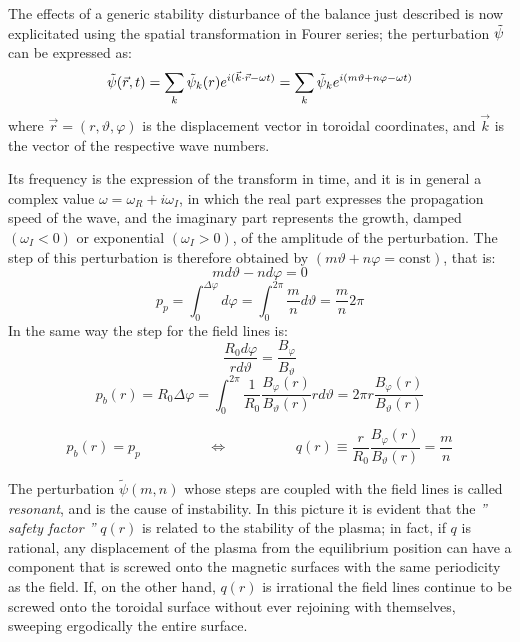 The effects of a generic stability disturbance of the balance just described is now explicitated using the spatial transformation in Fourer series; the perturbation $\Tilde{\psi}$ can be expressed as:
\begin{equation}
    \Tilde{\psi}(\Vec{r},t) = \sum_k \Tilde{\psi}_k(r) e^{i(\Vec{k}\cdot\Vec{r}-\omega t)} = \sum_k \Tilde{\psi}_k e^{i(m\vartheta+n\varphi-\omega t)}
\end{equation}
where $\Vec{r} = (r,\vartheta,\varphi)$ is the displacement vector in toroidal coordinates, and $\Vec{k}$ is the vector of the respective wave numbers.

Its frequency is the expression of the transform in time, and it is in general a complex value $\omega = \omega_R + i \omega_I$, in which the real part expresses the propagation speed of the wave, and the imaginary part represents the growth, damped $(\omega_I < 0)$ or exponential $(\omega_I > 0)$, of the amplitude of the perturbation. The step of this perturbation is therefore obtained by $(m\vartheta + n\varphi = \text{const})$, that is:
$$  m d\vartheta - n d\varphi = 0    $$
$$  p_p = \int_0^{\Delta\varphi} d\varphi = \int_0^{2\pi} \frac{m}{n}d\vartheta = \frac{m}{n} 2\pi  $$
In the same way the step for the field lines is:
$$  \frac{R_0 d\varphi}{r d\vartheta} = \frac{B_\varphi}{B_\vartheta} $$
$$  p_b(r) = R_0\Delta\varphi = \int_0^{2\pi} \frac{1}{R_0} \frac{B_\varphi(r)}{B_\vartheta(r)} r d\vartheta = 2\pi r \frac{B_\varphi(r)}{B_\vartheta(r)}  $$

\begin{equation}
    p_b(r) = p_p    \hspace{2cm} 	\iff \hspace{2cm}  q(r)\equiv \frac{r}{R_0}\frac{B_\varphi(r)}{B_\vartheta(r)}=\frac{m}{n}
\end{equation}



The perturbation $\tilde{\psi}(m,n)$ whose steps are coupled with the field lines is called \textit{resonant}, and is the cause of instability. In this picture it is evident that the \emph{'' safety factor ''} $q(r)$ is related to the stability of the plasma; in fact, if $q$ is rational, any displacement of the plasma from the equilibrium position can have a component that is screwed onto the magnetic surfaces with the same periodicity as the field. If, on the other hand, $q(r)$ is irrational the field lines continue to be screwed onto the toroidal surface without ever rejoining with themselves, sweeping ergodically the entire surface.


